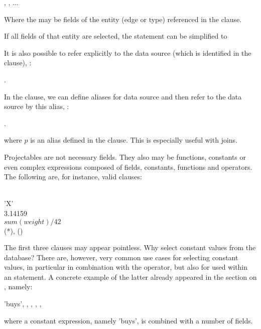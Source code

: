  , , $\dots$

Where the  may be fields of the entity (edge or type)
referenced in the  clause.

If all fields of that entity are selected,
the statement can be simplified to

 \keyword{*}

It is also possible to refer explicitly to the data source
(which is identified in the  clause), \eg:

 .

In the  clause, we can define aliases for data source
and then refer to the data source by this alias, \eg:

 .

where $p$ is an alias defined in the  clause.
This is especially useful with joins.

Projectables are not necessary fields.
They also may be functions, constants or even complex expressions
composed of fields, constants, functions and operators.
The following are, for instance, valid  clauses:

\begin{minipage}{\textwidth}
  \\
 'X' \\
 3.14159 \\
 $sum(weight)/42$ \\
 (*), ()
\end{minipage}

The first three clauses may appear pointless.
Why select constant values from the database?
There are, however, very common use cases
for selecting constant values, in particular
in combination with the  operator,
but also for  used within an
 statement. A concrete example
of the latter already appeared in the section
on , namely:

 'buys', ,
                         , 
                         , 
                         ,

where a constant expression, namely 'buys',
is combined with a number of fields.


